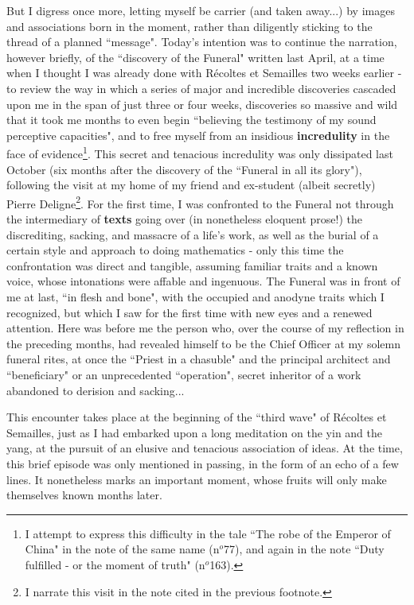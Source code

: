 But I digress once more, letting myself be carrier (and taken away...) by images and associations born in the moment, rather than diligently sticking to the thread of a planned ``message". Today's intention was to continue the narration, however briefly, of the ``discovery of the Funeral"
 written last April, at a time when I thought I was already done with R\'ecoltes et Semailles two weeks earlier - to review the way in which a series of major and incredible discoveries cascaded upon me in the span of just three or four weeks, discoveries so massive and wild that it took me months to even begin ``believing the testimony of my sound perceptive capacities", and to free myself from an insidious \textbf{incredulity} in the face of evidence\footnote{I attempt to express this difficulty in the tale ``The robe of the Emperor of China" in the note of the same name (n$^o$77), and again in the note ``Duty fulfilled - or the moment of truth" (n$^o$163).
}. This secret and tenacious incredulity was only dissipated last October (six months after the discovery of the ``Funeral in all its glory"),
following the visit at my home of my friend and ex-student (albeit secretly) Pierre Deligne\footnote{I narrate this visit in the note cited in the previous footnote.}. For the first time, I was confronted to the Funeral not through the intermediary of \textbf{texts} going over (in nonetheless eloquent prose!) the discrediting, sacking, and massacre of a life's work, as well as the burial of a certain style and approach to doing mathematics - only this time the confrontation was direct and tangible, assuming familiar traits and a known voice, whose intonations were affable and ingenuous. The Funeral was in front of me at last, ``in flesh and bone", with the occupied and anodyne traits which I recognized, but which I saw for the first time with new eyes and a renewed attention. Here was before me the person who, over the course of my reflection in the preceding months, had revealed himself to be the Chief Officer at my solemn funeral rites, at once the ``Priest in a chasuble" and the principal architect and ``beneficiary" or an unprecedented ``operation", secret inheritor of a work abandoned to derision and sacking...

This encounter takes place at the beginning of the ``third wave" of R\'ecoltes et Semailles, just as I had embarked upon a long meditation on the yin and the yang, at the pursuit of an elusive and tenacious association of ideas. At the time, this brief episode was only mentioned in passing, in the form of an echo of a few lines. It nonetheless marks an important moment, whose fruits will only make themselves known months later.

